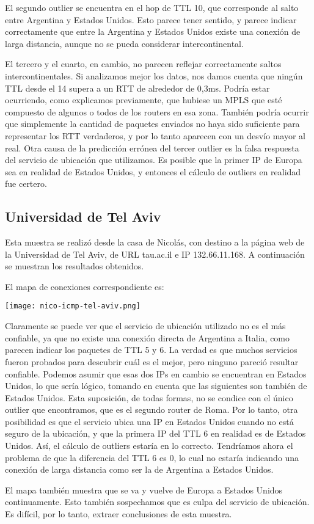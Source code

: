 El segundo outlier se encuentra en el hop de TTL 10, que corresponde al salto
entre Argentina y Estados Unidos. Esto parece tener sentido, y parece indicar
correctamente que entre la Argentina y Estados Unidos existe una conexión de
larga distancia, aunque no se pueda considerar intercontinental.

El tercero y el cuarto, en cambio, no parecen reflejar correctamente saltos
intercontinentales. Si analizamos mejor los datos, nos damos cuenta que ningún
TTL desde el 14 supera a un RTT de alrededor de 0,3ms. Podría estar ocurriendo,
como explicamos previamente, que hubiese un MPLS que esté compuesto de algunos
o todos de los routers en esa zona. También podría ocurrir que simplemente
la cantidad de paquetes enviados no haya sido suficiente para representar los
RTT verdaderos, y por lo tanto aparecen con un desvío mayor al real. Otra causa
de la predicción errónea del tercer outlier es la falsa respuesta del servicio
de ubicación que utilizamos. Es posible que la primer IP de Europa sea en
realidad de Estados Unidos, y entonces el cálculo de outliers en realidad fue
certero.

\subsection{Universidad de Tel Aviv}
Esta muestra se realizó desde la casa de Nicolás, con destino a la página web
de la Universidad de Tel Aviv, de URL tau.ac.il e IP 132.66.11.168.
A continuación se muestran los resultados obtenidos.



El mapa de conexiones correspondiente es:

\begin{center}
    \texttt{[image: nico-icmp-tel-aviv.png]}
\end{center}

Claramente se puede ver que el servicio de ubicación utilizado no es el más
confiable, ya que no existe una conexión directa de Argentina a Italia, como
parecen indicar los paquetes de TTL 5 y 6.
La verdad es que muchos servicios fueron probados para descubrir
cuál es el mejor, pero ninguno pareció resultar confiable.
Podemos asumir que esas dos IPs en cambio se encuentran en Estados Unidos,
lo que sería lógico, tomando en cuenta que las siguientes son también de 
Estados Unidos. Esta suposición, de todas formas, no se condice con el único
outlier que encontramos, que es el segundo router de Roma. Por lo tanto,
otra posibilidad es que el servicio ubica una IP en Estados Unidos cuando no
está seguro de la ubicación, y que la primera IP del TTL 6 en realidad es 
de Estados Unidos. Así, el cálculo de outliers estaría en lo correcto. 
Tendríamos ahora el problema de que la diferencia del TTL 6 es 0, lo cual no
estaría indicando una conexión de larga distancia como ser la de Argentina a Estados
Unidos.

El mapa también muestra que se va y vuelve de Europa a Estados Unidos continuamente.
Esto también sospechamos que es culpa del servicio de ubicación. Es difícil,
por lo tanto, extraer conclusiones de esta muestra.
